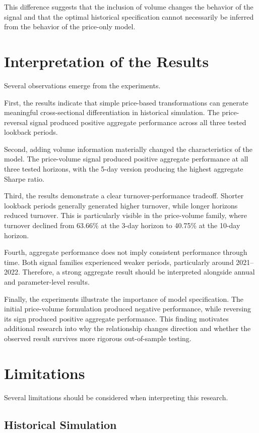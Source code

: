 \documentclass{article}
\begin{document}
This difference suggests that the inclusion of volume changes the behavior of the signal and that the optimal historical specification cannot necessarily be inferred from the behavior of the price-only model.

\section{Interpretation of the Results}

Several observations emerge from the experiments.

First, the results indicate that simple price-based transformations can generate meaningful cross-sectional differentiation in historical simulation. The price-reversal signal produced positive aggregate performance across all three tested lookback periods.

Second, adding volume information materially changed the characteristics of the model. The price-volume signal produced positive aggregate performance at all three tested horizons, with the 5-day version producing the highest aggregate Sharpe ratio.

Third, the results demonstrate a clear turnover-performance tradeoff. Shorter lookback periods generally generated higher turnover, while longer horizons reduced turnover. This is particularly visible in the price-volume family, where turnover declined from 63.66\% at the 3-day horizon to 40.75\% at the 10-day horizon.

Fourth, aggregate performance does not imply consistent performance through time. Both signal families experienced weaker periods, particularly around 2021–2022. Therefore, a strong aggregate result should be interpreted alongside annual and parameter-level results.

Finally, the experiments illustrate the importance of model specification. The initial price-volume formulation produced negative performance, while reversing its sign produced positive aggregate performance. This finding motivates additional research into why the relationship changes direction and whether the observed result survives more rigorous out-of-sample testing.

\section{Limitations}

Several limitations should be considered when interpreting this research.

\subsection{Historical Simulation}
\end{document}
